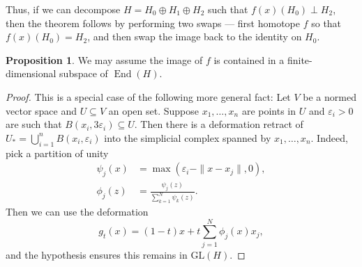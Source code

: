 \documentclass{shortart}
\theoremstyle{definition}
\newtheorem*{prop}{Proposition}
\DeclareMathOperator{\End}{End}
\newcommand\GL{\mathrm{GL}}
\begin{document}
Thus, if we can decompose $H = H_0 \oplus H_1 \oplus H_2$ such that $f(x)(H_0) \perp H_2$, then the theorem follows by performing two swaps --- first homotope $f$ so that $f(x)(H_0) = H_2$, and then swap the image back to the identity on $H_0$.

\begin{prop}
  We may assume the image of $f$ is contained in a finite-dimensional subspace of $\End(H)$.
\end{prop}
\begin{proof}
  This is a special case of the following more general fact: Let $V$ be a normed vector space and $U \subseteq V$ an open set. Suppose $x_1, \ldots, x_n$ are points in $U$ and $\varepsilon_i > 0$ are such that $B(x_i, 3 \varepsilon_i) \subseteq U$. Then there is a deformation retract of $U_* = \bigcup_{i = 1}^n B(x_i, \varepsilon_i)$ into the simplicial complex spanned by $x_1, \ldots, x_n$. Indeed, pick a partition of unity
  \begin{align*}
    \psi_j(x) &= \max(\varepsilon_i - \|x - x_j\|, 0),\\
    \phi_j(z) &= \frac{\psi_j(z)}{\sum_{k = 1}^N \psi_k(z)}.
  \end{align*}
  Then we can use the deformation
  \[
    g_t(x) = (1 - t) x + t \sum_{j = 1}^N \phi_j(x) x_j,
  \]
  and the hypothesis ensures this remains in $\GL(H)$.
\end{proof}
\end{document}
